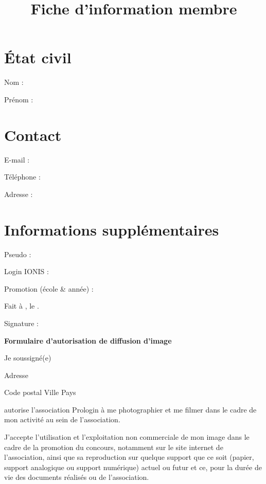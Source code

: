 \documentclass[a4paper,12pt]{prologin}
\title{Fiche d'information membre}
\begin{document}
\section*{État civil}

Nom : \hrulefill

Prénom : \hrulefill

\section*{Contact}

E-mail : \hrulefill

Téléphone : \hrulefill

Adresse : \hrulefill

\hrulefill

\section*{Informations supplémentaires}
Pseudo : \hrulefill

Login IONIS : \hrulefill

Promotion (école \& année) : \hrulefill

\vspace{2cm}

Fait à \hrulefill, le \hrulefill.

Signature :

\newpage

\begin{Large}
    \begin{center}
        \textbf{Formulaire d'autorisation de diffusion d'image}
    \end{center}
\end{Large}

Je soussigné(e) \hrulefill

Adresse \hrulefill

Code postal \hrulefill{} Ville \hrulefill\hrulefill\hrulefill{} Pays \hrulefill

autorise l'association Prologin à me photographier et me filmer dans
le cadre de mon activité au sein de l'association.

J'accepte l'utilisation et l'exploitation non commerciale de mon
image dans le cadre de la promotion du concours, notamment sur le site internet
de l'association, ainsi que sa reproduction sur quelque support que ce soit
(papier, support analogique ou support numérique) actuel ou futur et ce, pour la
durée de vie des documents réalisés ou de l'association.
\end{document}
